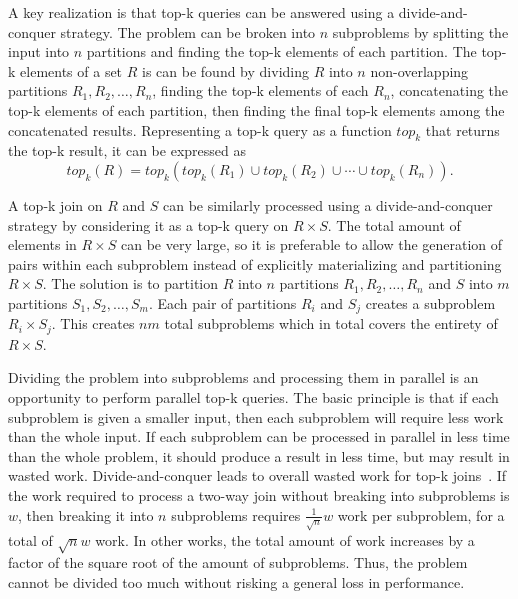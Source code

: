 A key realization is that top-k queries can be answered using a divide-and-conquer strategy. The problem can be broken into \(n\) subproblems by splitting the input into \(n\) partitions and finding the top-k elements of each partition. The top-k elements of a set \(R\) is can be found by dividing \(R\) into \(n\) non-overlapping partitions \(R_1, R_2, \dotsc, R_n\), finding the top-k elements of each \(R_n\), concatenating the top-k elements of each partition, then finding the final top-k elements among the concatenated results. Representing a top-k query as a function \(top_k\) that returns the top-k result, it can be expressed as
\[
  top_k(R) = top_k(top_k(R_1) \cup top_k(R_2) \cup \cdots \cup top_k(R_n)).
\]

A top-k join on \(R\) and \(S\) can be similarly processed using a divide-and-conquer strategy by considering it as a top-k query on \(R \times S\). The total amount of elements in \(R \times S\) can be very large, so it is preferable to allow the generation of pairs within each subproblem instead of explicitly materializing and partitioning \(R \times S\). The solution is to partition \(R\) into \(n\) partitions \(R_1, R_2, \dotsc, R_n\) and \(S\) into \(m\) partitions \(S_1, S_2, \dotsc, S_m\). Each pair of partitions \(R_i\) and \(S_j\) creates a subproblem \(R_i \times S_j\). This creates \(nm\) total subproblems which in total covers the entirety of \(R \times S\).

Dividing the problem into subproblems and processing them in parallel is an opportunity to perform parallel top-k queries. The basic principle is that if each subproblem is given a smaller input, then each subproblem will require less work than the whole input. If each subproblem can be processed in parallel in less time than the whole problem, it should produce a result in less time, but may result in wasted work. Divide-and-conquer leads to overall wasted work for top-k joins~\cite{yu2010workload}. If the work required to process a two-way join without breaking into subproblems is \(w\), then breaking it into \(n\) subproblems requires \(\frac{1}{\sqrt{n}} w\) work per subproblem, for a total of \(\sqrt{n} w\) work. In other works, the total amount of work increases by a factor of the square root of the amount of subproblems. Thus, the problem cannot be divided too much without risking a general loss in performance.


